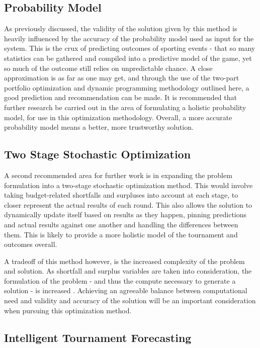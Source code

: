 \documentclass[12pt]{article}
\begin{document}
\subsection{Probability Model}
As previously discussed, the validity of the solution given by this method is heavily influenced by the accuracy of the probability model used as input for the system.
This is the crux of predicting outcomes of sporting events - that so many statistics can be gathered and compiled into a predictive model of the game, yet so much of the outcome still relies on unpredictable chance.
A close approximation is as far as one may get, and through the use of the two-part portfolio optimization and dynamic programming methodology outlined here, a good prediction and recommendation can be made.
It is recommended that further research be carried out in the area of formulating a holistic probability model, for use in this optimization methodology.
Overall, a more accurate probability model means a better, more trustworthy solution.

\subsection{Two Stage Stochastic Optimization}
A second recommended area for further work is in expanding the problem formulation into a two-stage stochastic optimization method.
This would involve taking budget-related shortfalls and surpluses into account at each stage, to closer represent the actual results of each round.
This also allows the solution to dynamically update itself based on results as they happen, pinning predictions and actual results against one another and handling the differences between them.
This is likely to provide a more holistic model of the tournament and outcomes overall.

A tradeoff of this method however, is the increased complexity of the problem and solution.
As shortfall and surplus variables are taken into consideration, the formulation of the problem - and thus the compute necessary to generate a solution - is increased \cite{robinson1987stability}.
Achieving an agreeable balance between computational need and validity and accuracy of the solution will be an important consideration when pursuing this optimization method.

\subsection{Intelligent Tournament Forecasting}
\end{document}
